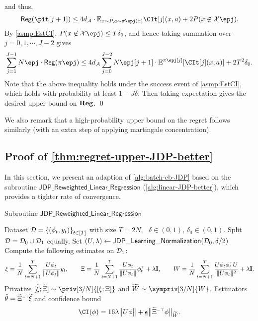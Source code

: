 and thus,
\begin{align*}
    \reg(\pit[j+1])
    \leq 4\dA\cdot \EE_{x\sim P, a\sim \pi\epj(x) }{ \CIt[j](x,a) } + 2P(x\not\in\cX\epj).
\end{align*}
By \cref{asmp:EstCI}, $P(x\not\in\cX\epj)\leq T\delta_0$, and hence taking summation over $j=0,1,\cdots,J-2$ gives
\begin{align*}
    \sum_{j=1}^{J-1} N\epj \cdot \reg(\pi\epj)
    \leq 4\dA\sum_{j=0}^{J-2} N\epj[j+1] \cdot \EE^{\pi\epj[j]}\brac{ \CIt[j](x,a) } +2T^2 \delta_0.
\end{align*}
Note that the above inequality holds under the success event of \cref{asmp:EstCI}, which holds with probability at least $1-J\delta$. Then taking expectation gives the desired upper bound on $\mathbf{Reg}$.
\qed

We also remark that a high-probability upper bound on the regret follows similarly (with an extra step of applying martingale concentration).


\subsection{Proof of \cref{thm:regret-upper-JDP-better}}\label{appdx:proof-regret-upper-JDP-better}

\newcommand{\AlgJDPLR}{\mathsf{JDP\_Reweighted\_Linear\_Regression}}
\newcommand{\delz}{\delta_0}
\newcommand{\lamz}{\lambda_0}

In this section, we present an adaption of \cref{alg:batch-cb-JDP} based on the subroutine $\AlgJDPLR$ (\cref{alg:linear-JDP-better}), which provides a tighter rate of convergence.

\newcommand{\gu}[1]{\frac{U#1}{\|U#1\|}}
\newcommand{\sumnt}{\sum_{t=N+1}^T}
\newcommand{\avgtt}{\frac{1}{N}\sum_{t=N+1}^T}
\newcommand{\sumtt}{\sum_{t=N+1}^T}
\renewcommand{\zt}{\zeta_t}


\begin{algorithm}
\caption{Subroutine $\AlgJDPLR$}\label{alg:linear-JDP-better}
\begin{algorithmic}[1]
\REQUIRE Dataset $\mathcal{D}=\left\{(\phi_t,y_t)\right\}_{t\in[T]}$ with size $T=2N$, \errpara~$\delta\in(0,1)$, $\delz\in(0,1)$.
\STATE Split $\mathcal{D}=\mathcal{D}_0\cup \mathcal{D}_1$ equally.
\STATE Set $(U,\lambda)\leftarrow \mathsf{JDP\_Learning\_Normalization}(\mathcal{D}_0,\delta/2)$
\STATE Compute the following estimates on $\mathcal{D}_1$:
\begin{align*}
    \xi=\avgtt \gu{\x_t}y_t, \qquad \Xi=\avgtt \gu{\x_t}\x_t\tp+\lambda\id, \qquad 
    W=\avgtt \frac{U\x_t \x_t\tp U}{\|U\x_t\|^2}+\lambda\id.
\end{align*}
\STATE Privatize $[\til \xi; \til \Xi] \sim \priv[3/N]{ [\xi; \Xi] }$ and $\til W\sim \sympriv[3/N]{W}$.
\ENSURE Estimators $\hat{\theta}={\widetilde \Xi}^{{\scriptscriptstyle-1}}{\widetilde \xi}$ and confidence bound
\begin{align*}
    \CI(\x)=16\lambda\nrmn{U\x}+\lamgd\nrmn{{\til \Xi}\itp \x}_{\til W}.
\end{align*}
\end{algorithmic}
\end{algorithm}

